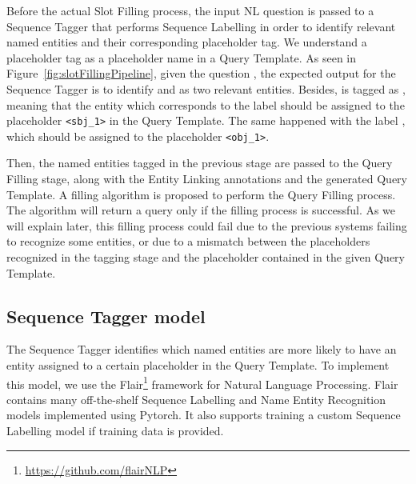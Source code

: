 Before the actual Slot Filling process, the input NL question is passed to a Sequence Tagger 
that performs Sequence Labelling in order to identify relevant named entities and their 
corresponding placeholder tag. We understand a placeholder tag as a placeholder name in a 
Query Template. As seen in Figure~\ref{fig:slotFillingPipeline}, given the question 
, the expected output for the Sequence Tagger is to 
identify  and  as two relevant entities. Besides, 
 is tagged as , meaning that the entity which 
corresponds to the label  should be assigned to the placeholder 
\texttt{<sbj\_1>} in the Query Template. The same happened with the label , 
which should be assigned to the placeholder \texttt{<obj\_1>}.

Then, the named entities tagged in the previous stage are passed to the Query Filling stage, 
along with the Entity Linking annotations and the generated Query Template. A filling 
algorithm is proposed to perform the Query Filling process. The algorithm will return a 
\SPARQL{} query only if the filling process is successful. As we will explain later, this filling 
process could fail due to the previous systems failing to recognize some entities, or due to 
a mismatch between the placeholders recognized in the tagging stage and the placeholder 
contained in the given Query Template.

\subsection{Sequence Tagger model}
\label{cap3:system/slotFillModule/seqTagger}
The Sequence Tagger identifies which named entities are more likely to have an entity 
assigned to a certain placeholder in the Query Template. To implement this model, we use the 
Flair\footnote{\url{https://github.com/flairNLP}} framework for Natural Language Processing. Flair 
contains many off-the-shelf Sequence Labelling and Name Entity Recognition models implemented 
using Pytorch. It also supports  training a custom Sequence Labelling model if training data 
is provided.

